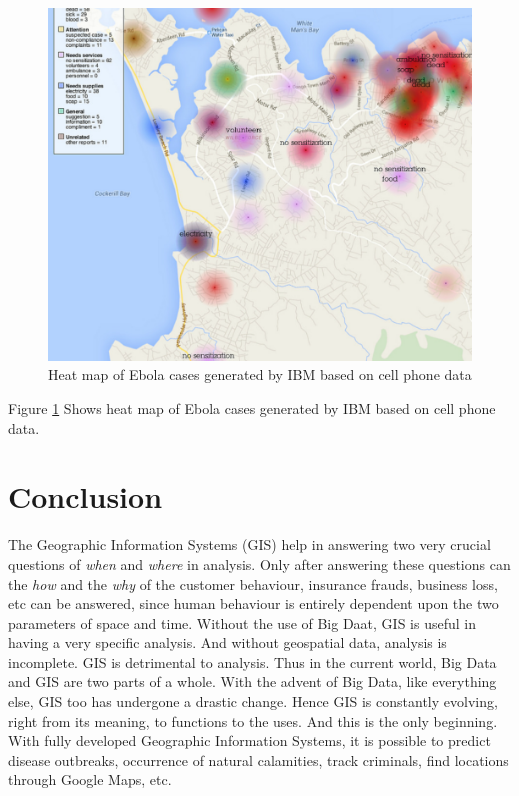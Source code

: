 \begin{figure}
	\includegraphics[width=\columnwidth]{images/ebola-heat-map.png}
	\caption{Heat map of Ebola cases generated by IBM based on cell phone data \cite{link12}}
	\label{F:heatmap}
\end{figure}
Figure \ref{F:heatmap} Shows heat map of Ebola cases generated by IBM based on cell phone data.\\

\section{Conclusion}
The Geographic Information Systems (GIS) help in answering two very crucial questions of \emph{when} and \emph{where} in analysis. Only after answering these questions can the \emph{how} and the \emph{why} of the customer behaviour, insurance frauds, business loss, etc can be answered, since human behaviour is entirely dependent upon the two parameters of space and time. Without the use of Big Daat, GIS is useful in having a very specific analysis. And without geospatial data, analysis is incomplete. GIS is detrimental to analysis. Thus in the current world, Big Data and GIS are two parts of a whole. With the advent of Big Data, like everything else, GIS too has undergone a drastic change. Hence GIS is constantly evolving, right from its meaning, to functions to the uses. And this is the only beginning. With fully developed Geographic Information Systems, it is possible to predict disease outbreaks, occurrence of natural calamities, track criminals, find locations through Google Maps, etc. 


 
